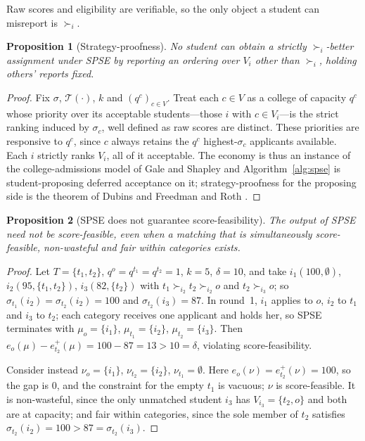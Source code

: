 \documentclass[a4paper,twoside]{article}
\newtheorem{proposition}{Proposition}
\theoremstyle{definition}
\renewcommand{\T}{\mathcal{T}}
\begin{document}
Raw scores and eligibility are verifiable, so the only object a student can misreport is $\succ_i$.

\begin{proposition}[Strategy-proofness]
\label{prop:spse-sp}
No student can obtain a strictly $\succ_i$-better assignment under SPSE by reporting an ordering over $V_i$ other than $\succ_i$, holding others' reports fixed.
\end{proposition}

\begin{proof}
Fix $\sigma$, $\T(\cdot)$, $k$ and $(q^c)_{c\in V}$. Treat each $c\in V$ as a college of capacity $q^c$ whose priority over its acceptable students---those $i$ with $c\in V_i$---is the strict ranking induced by $\sigma_c$, well defined as raw scores are distinct. These priorities are responsive to $q^c$, since $c$ always retains the $q^c$ highest-$\sigma_c$ applicants available. Each $i$ strictly ranks $V_i$, all of it acceptable. The economy is thus an instance of the college-admissions model of Gale and Shapley \cite{GaSh62a} and Algorithm~\ref{alg:spse} is student-proposing deferred acceptance on it; strategy-proofness for the proposing side is the theorem of Dubins and Freedman \cite{DuFr81a} and Roth \cite{Roth82a}.
\end{proof}

\begin{proposition}[SPSE does not guarantee score-feasibility]
\label{prop:spse-not-sf}
The output of SPSE need not be score-feasible, even when a matching that is simultaneously score-feasible, non-wasteful and fair within categories exists.
\end{proposition}

\begin{proof}
Let $T=\{t_1,t_2\}$, $q^o=q^{t_1}=q^{t_2}=1$, $k=5$, $\delta=10$, and take $i_1(100,\emptyset)$, $i_2(95,\{t_1,t_2\})$, $i_3(82,\{t_2\})$ with $t_1\succ_{i_2}t_2\succ_{i_2}o$ and $t_2\succ_{i_3}o$; so $\sigma_{t_1}(i_2)=\sigma_{t_2}(i_2)=100$ and $\sigma_{t_2}(i_3)=87$. In round~1, $i_1$ applies to $o$, $i_2$ to $t_1$ and $i_3$ to $t_2$; each category receives one applicant and holds her, so SPSE terminates with $\mu_o=\{i_1\}$, $\mu_{t_1}=\{i_2\}$, $\mu_{t_2}=\{i_3\}$. Then $e_o(\mu)-e_{t_2}^+(\mu)=100-87=13>10=\delta$, violating score-feasibility.

Consider instead $\nu_o=\{i_1\}$, $\nu_{t_2}=\{i_2\}$, $\nu_{t_1}=\emptyset$. Here $e_o(\nu)=e_{t_2}^+(\nu)=100$, so the gap is $0$, and the constraint for the empty $t_1$ is vacuous; $\nu$ is score-feasible. It is non-wasteful, since the only unmatched student $i_3$ has $V_{i_3}=\{t_2,o\}$ and both are at capacity; and fair within categories, since the sole member of $t_2$ satisfies $\sigma_{t_2}(i_2)=100>87=\sigma_{t_2}(i_3)$.
\end{proof}
\end{document}
